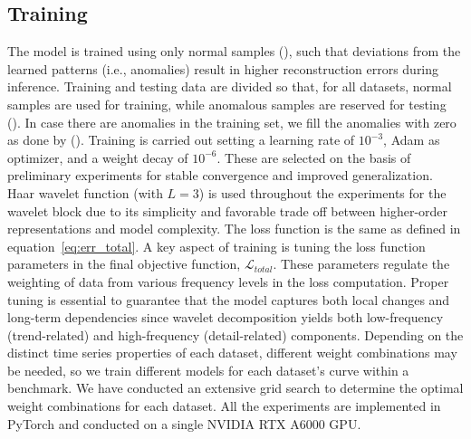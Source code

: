     
\subsection{Training }
The model is trained using only normal samples (\cite{anomaly-review}), such that deviations from the learned patterns (i.e., anomalies) result in higher reconstruction errors during inference. Training and testing data are divided so that, for all datasets, normal samples are used for training, while anomalous samples are reserved for testing (\cite{tsvae}). In case there are anomalies in the training set, we fill the anomalies with zero as done by (\cite{fcvae}). 
Training is carried out setting a learning rate of $10^{-3}$, Adam as optimizer, and a weight decay of $10^{-6}$. These are selected on the basis of preliminary experiments for stable convergence and improved generalization. Haar wavelet function (with $L=3$) is used throughout the experiments for the wavelet block due to its simplicity and favorable trade off between higher-order representations and model complexity. The loss function is the same as defined in equation~\eqref{eq:err_total}. A key aspect of training is tuning the loss function parameters in the final objective function, $\mathcal{L}_{total}$. These parameters regulate the weighting of data from various frequency levels in the loss computation. Proper tuning is essential to guarantee that the model captures both local changes and long-term dependencies since wavelet decomposition yields both low-frequency (trend-related) and high-frequency (detail-related) components. Depending on the distinct time series properties of each dataset, different weight combinations may be needed, so we train different models for each dataset's curve within a benchmark. We have conducted an extensive grid search to determine the optimal weight combinations for each dataset. All the experiments are implemented in PyTorch and conducted on a single NVIDIA RTX A6000 GPU.


